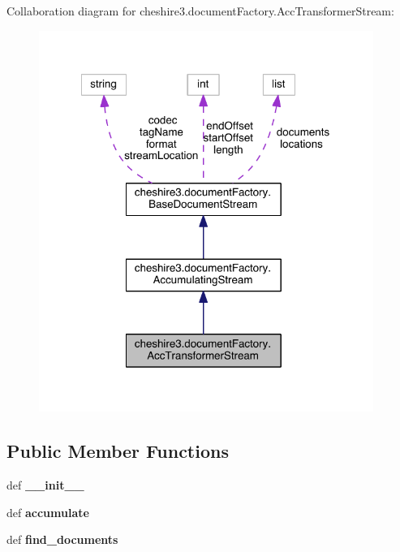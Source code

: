 Collaboration diagram for cheshire3.\-document\-Factory.\-Acc\-Transformer\-Stream\-:
\nopagebreak
\begin{figure}[H]
\begin{center}
\leavevmode
\includegraphics[width=309pt]{classcheshire3_1_1document_factory_1_1_acc_transformer_stream__coll__graph}
\end{center}
\end{figure}
\subsection*{Public Member Functions}
\begin{DoxyCompactItemize}
\item 
\hypertarget{classcheshire3_1_1document_factory_1_1_acc_transformer_stream_a43ff32b681be6a464faf436eb29fe6a6}{def {\bfseries \-\_\-\-\_\-init\-\_\-\-\_\-}}\label{classcheshire3_1_1document_factory_1_1_acc_transformer_stream_a43ff32b681be6a464faf436eb29fe6a6}

\item 
\hypertarget{classcheshire3_1_1document_factory_1_1_acc_transformer_stream_a4393fafb293ec4903ad9f07a68a188ef}{def {\bfseries accumulate}}\label{classcheshire3_1_1document_factory_1_1_acc_transformer_stream_a4393fafb293ec4903ad9f07a68a188ef}

\item 
\hypertarget{classcheshire3_1_1document_factory_1_1_acc_transformer_stream_ab14a78b33ce0d08fecf30cd670e4a2b6}{def {\bfseries find\-\_\-documents}}\label{classcheshire3_1_1document_factory_1_1_acc_transformer_stream_ab14a78b33ce0d08fecf30cd670e4a2b6}

\end{DoxyCompactItemize}
